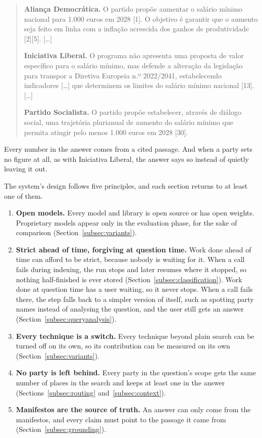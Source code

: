 \begin{quote}
\small
\textbf{Aliança Democrática.} O partido propõe aumentar o salário mínimo
nacional para 1.000 euros em 2028 [1]. O objetivo é garantir que o aumento
seja feito em linha com a inflação acrescida dos ganhos de produtividade
[2][5]. [\ldots]

\textbf{Iniciativa Liberal.} O programa não apresenta uma proposta de valor
específico para o salário mínimo, mas defende a alteração da legislação para
transpor a Diretiva Europeia n.º 2022/2041, estabelecendo indicadores [\ldots]
que determinem os limites do salário mínimo nacional [13]. [\ldots]

\textbf{Partido Socialista.} O partido propõe estabelecer, através de diálogo
social, uma trajetória plurianual de aumento do salário mínimo que permita
atingir pelo menos 1.000 euros em 2028 [30].
\end{quote}

Every number in the answer comes from a cited passage. And when a party sets
no figure at all, as with Iniciativa Liberal, the answer says so instead
of quietly leaving it out.

The system's design follows five principles, and each section returns to at least one
of them.
\begin{enumerate}
    \item \textbf{Open models.} Every model and library is open source or has
    open weights. Proprietary models appear only in the evaluation phase, for
    the sake of comparison (Section~\ref{subsec:variants}).
    \item \textbf{Strict ahead of time, forgiving at question time.} Work done ahead of time
    can afford to be strict, because nobody is waiting for it. When a call
    fails during indexing, the run stops and later resumes where it stopped, so
    nothing half-finished is ever stored (Section~\ref{subsec:classification}).
    Work done at question time has a user waiting, so it never stops. When a
    call fails there, the step falls back to a simpler version of itself, such
    as spotting party names instead of analysing the question, and the user
    still gets an answer (Section~\ref{subsec:queryanalysis}).
    \item \textbf{Every technique is a switch.} Every technique beyond plain
    search can be turned off on its own, so its contribution can be measured
    on its own (Section~\ref{subsec:variants}).
    \item \textbf{No party is left behind.} Every party in the question's scope
    gets the same number of places in the search and keeps at least one in the answer
    (Sections~\ref{subsec:routing} and~\ref{subsec:context}).
    \item \textbf{Manifestos are the source of truth.} An answer can only come from the
    manifestos, and every claim must point to the passage it came from
    (Section~\ref{subsec:grounding}).
\end{enumerate}

